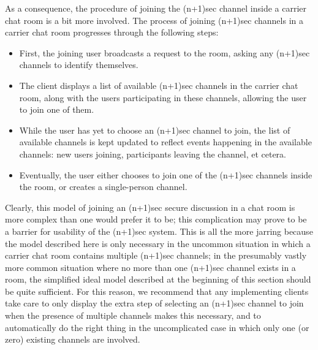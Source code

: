 \documentclass{article}
\begin{document}
As a consequence, the procedure of joining the (n+1)sec channel inside a carrier chat room is a bit more involved.
The process of joining (n+1)sec channels in a carrier chat room progresses through the following steps:
\begin{itemize}
\item First, the joining user broadcasts a request to the room, asking any (n+1)sec channels to identify themselves.
\item The client displays a list of available (n+1)sec channels in the carrier chat room, along with the users participating in these channels, allowing the user to join one of them.
\item While the user has yet to choose an (n+1)sec channel to join, the list of available channels is kept updated to reflect events happening in the available channels: new users joining, participants leaving the channel, et cetera.
\item Eventually, the user either chooses to join one of the (n+1)sec channels inside the room, or creates a single-person channel.
\end{itemize}
Clearly, this model of joining an (n+1)sec secure discussion in a chat room is more complex than one would prefer it to be; this complication may prove to be a barrier for usability of the (n+1)sec system.
This is all the more jarring because the model described here is only necessary in the uncommon situation in which a carrier chat room contains multiple (n+1)sec channels; in the presumably vastly more common situation where no more than one (n+1)sec channel exists in a room, the simplified ideal model described at the beginning of this section should be quite sufficient.
For this reason, we recommend that any implementing clients take care to only display the extra step of selecting an (n+1)sec channel to join when the presence of multiple channels makes this necessary, and to automatically do the right thing in the uncomplicated case in which only one (or zero) existing channels are involved.
\end{document}
